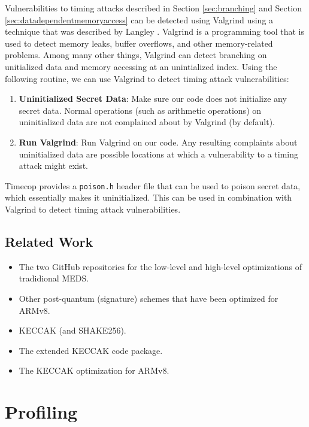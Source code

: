 \documentclass[11pt,a4paper]{report}
\theoremstyle{definition}
\begin{document}
Vulnerabilities to timing attacks described in Section \ref{sec:branching} and Section \ref{sec:datadependentmemoryaccess} can be detected using Valgrind \cite{nethercote2007valgrind} using a technique that was described by Langley \cite{langley2010checking,langley2010ctgrind}. Valgrind is a programming tool that is used to detect memory leaks, buffer overflows, and other memory-related problems. Among many other things, Valgrind can detect branching on unitialized data and memory accessing at an unintialized index. Using the following routine, we can use Valgrind to detect timing attack vulnerabilities:
\begin{enumerate}
  \item \textbf{Uninitialized Secret Data}: Make sure our code does not initialize any secret data. Normal operations (such as arithmetic operations) on uninitialized data are not complained about by Valgrind (by default).
  \item \textbf{Run Valgrind}: Run Valgrind on our code. Any resulting complaints about uninitialized data are possible locations at which a vulnerability to a timing attack might exist.
\end{enumerate}

Timecop \cite{timecop} provides a \texttt{poison.h} header file that can be used to poison secret data, which essentially makes it uninitialized. This can be used in combination with Valgrind to detect timing attack vulnerabilities.

\section{Related Work}
\begin{itemize}
  \item The two GitHub repositories for the low-level and high-level optimizations of tradidional MEDS.
  \item Other post-quantum (signature) schemes that have been optimized for ARMv8.
  \item KECCAK (and SHAKE256).
  \item The extended KECCAK code package.
  \item The KECCAK optimization for ARMv8.
\end{itemize}

\chapter{Profiling}
\label{ch:profiling}
\end{document}

